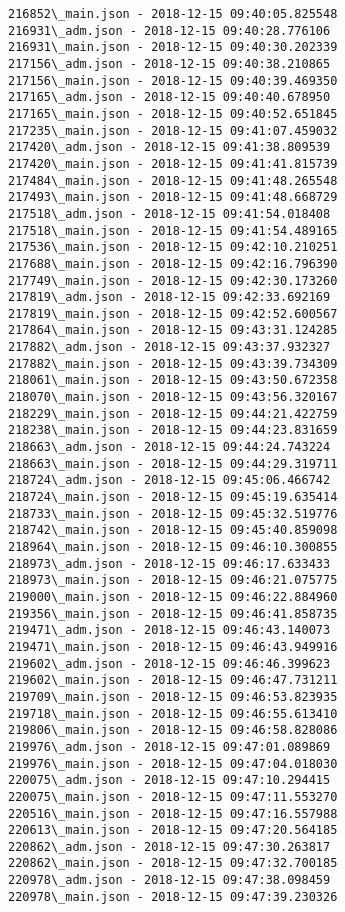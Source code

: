 \documentclass[11pt]{article}
\begin{document}
    \begin{Verbatim}[commandchars=\\\{\}]
216852\_main.json - 2018-12-15 09:40:05.825548
216931\_adm.json - 2018-12-15 09:40:28.776106
216931\_main.json - 2018-12-15 09:40:30.202339
217156\_adm.json - 2018-12-15 09:40:38.210865
217156\_main.json - 2018-12-15 09:40:39.469350
217165\_adm.json - 2018-12-15 09:40:40.678950
217165\_main.json - 2018-12-15 09:40:52.651845
217235\_main.json - 2018-12-15 09:41:07.459032
217420\_adm.json - 2018-12-15 09:41:38.809539
217420\_main.json - 2018-12-15 09:41:41.815739
217484\_main.json - 2018-12-15 09:41:48.265548
217493\_main.json - 2018-12-15 09:41:48.668729
217518\_adm.json - 2018-12-15 09:41:54.018408
217518\_main.json - 2018-12-15 09:41:54.489165
217536\_main.json - 2018-12-15 09:42:10.210251
217688\_main.json - 2018-12-15 09:42:16.796390
217749\_main.json - 2018-12-15 09:42:30.173260
217819\_adm.json - 2018-12-15 09:42:33.692169
217819\_main.json - 2018-12-15 09:42:52.600567
217864\_main.json - 2018-12-15 09:43:31.124285
217882\_adm.json - 2018-12-15 09:43:37.932327
217882\_main.json - 2018-12-15 09:43:39.734309
218061\_main.json - 2018-12-15 09:43:50.672358
218070\_main.json - 2018-12-15 09:43:56.320167
218229\_main.json - 2018-12-15 09:44:21.422759
218238\_main.json - 2018-12-15 09:44:23.831659
218663\_adm.json - 2018-12-15 09:44:24.743224
218663\_main.json - 2018-12-15 09:44:29.319711
218724\_adm.json - 2018-12-15 09:45:06.466742
218724\_main.json - 2018-12-15 09:45:19.635414
218733\_main.json - 2018-12-15 09:45:32.519776
218742\_main.json - 2018-12-15 09:45:40.859098
218964\_main.json - 2018-12-15 09:46:10.300855
218973\_adm.json - 2018-12-15 09:46:17.633433
218973\_main.json - 2018-12-15 09:46:21.075775
219000\_main.json - 2018-12-15 09:46:22.884960
219356\_main.json - 2018-12-15 09:46:41.858735
219471\_adm.json - 2018-12-15 09:46:43.140073
219471\_main.json - 2018-12-15 09:46:43.949916
219602\_adm.json - 2018-12-15 09:46:46.399623
219602\_main.json - 2018-12-15 09:46:47.731211
219709\_main.json - 2018-12-15 09:46:53.823935
219718\_main.json - 2018-12-15 09:46:55.613410
219806\_main.json - 2018-12-15 09:46:58.828086
219976\_adm.json - 2018-12-15 09:47:01.089869
219976\_main.json - 2018-12-15 09:47:04.018030
220075\_adm.json - 2018-12-15 09:47:10.294415
220075\_main.json - 2018-12-15 09:47:11.553270
220516\_main.json - 2018-12-15 09:47:16.557988
220613\_main.json - 2018-12-15 09:47:20.564185
220862\_adm.json - 2018-12-15 09:47:30.263817
220862\_main.json - 2018-12-15 09:47:32.700185
220978\_adm.json - 2018-12-15 09:47:38.098459
220978\_main.json - 2018-12-15 09:47:39.230326

\end{Verbatim}
\end{document}
